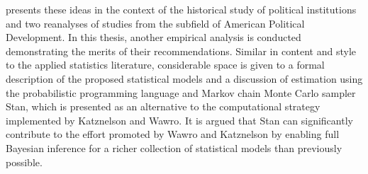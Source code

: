  presents these ideas in the context of the historical study of political 
institutions and two reanalyses of studies from the subfield of American Political 
Development. In this thesis, another empirical analysis is conducted demonstrating the merits 
of their recommendations. Similar in content and style to the applied statistics literature, 
considerable space is given to a formal description of the proposed statistical models and 
a discussion of estimation using the probabilistic programming 
language and Markov chain Monte Carlo sampler Stan, which is presented as an alternative to 
the computational strategy implemented by Katznelson and Wawro. It is argued that Stan can 
significantly contribute to the effort promoted by Wawro and Katznelson by enabling full Bayesian 
inference for a richer collection of statistical models than previously possible. 



%




